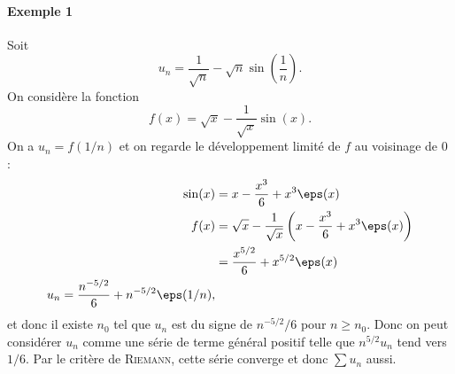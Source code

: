\paragraph{Exemple 1}Soit \[ u_n = \frac{1}{\sqrt{n}} - \sqrt{n}\sin\left(\frac{1}{n}\right).\]
On considère la fonction \[f(x) = \sqrt{x} - \frac{1}{\sqrt{x}}\sin(x). \]On a $u_n = f(1/n)$ et on regarde le développement limité de $f$ au voisinage de $0$ : 
\begin{align*}
\sin(x) &= x - \frac{x^{3}}{6} + x^{3}\eps(x) \\
f(x) &= \sqrt{x} - \frac{1}{\sqrt{x}}\left(x-\frac{x^{3}}{6} + x^{3}\eps(x)\right)\\
&= \frac{x^{5/2}}{6} + x^{5/2}\eps(x) \\
u_n = \frac{n^{-5/2}}{6} + n^{-5/2}\eps(1/n),
\end{align*}
et donc il existe $n_0$ tel que $u_n$ est du signe de $n^{-5/2}/6$ pour $n\geq n_0$. Donc on peut considérer $u_n$ comme une série de terme général positif telle que $n^{5/2}u_n$ tend vers $1/6$. Par le critère de \textsc{Riemann}, cette série converge et donc $\sum u_n$ aussi.

